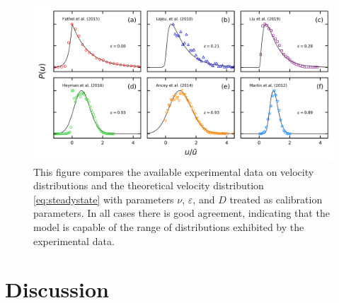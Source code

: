 \begin{figure}
	\centerline{\includegraphics{./figures/ch5/Fig4expComparison.png}}
	\caption{This figure compares the available experimental data on velocity distributions and the theoretical velocity distribution \ref{eq:steadystate} with parameters $\nu$, $\varepsilon$, and $D$ treated as calibration parameters. In all cases there is good agreement, indicating that the model is capable of the range of distributions exhibited by the experimental data.} \label{fig:fig4ch5}
\end{figure}


\section{Discussion}
\label{sec:langdiscussion}

